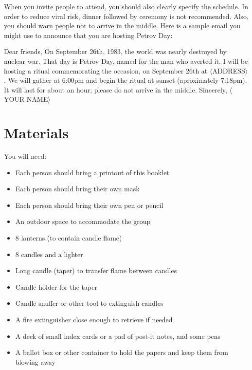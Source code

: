 \documentclass{article}
\begin{document}
When you invite people to attend, you should also clearly specify the
schedule. In order to reduce viral risk, dinner followed by ceremony is not
recommended. Also, you should warn people not to arrive in the middle. Here is
a sample email you might use to announce that you are hosting Petrov Day:

\begin{center}
	\parbox{4.5in}{
	Dear friends,\newline
	On September 26th, 1983, the world was nearly destroyed by nuclear war.
	That day is Petrov Day, named for the man who averted it. I will be
	hosting a ritual commemorating the occasion, on September 26th at
	$\langle$ADDRESS$\rangle$. We will gather at 6:00pm and begin the ritual
	at sunset (aproximately 7:18pm). It will last for about an hour; please do
	not arrive in the middle.\newline
	Sincerely,\newline
	$\langle$YOUR NAME$\rangle$}
\end{center}

\section{Materials}
You will need:

\begin{itemize} \itemsep0pt \parskip0pt 
    \item Each person should bring a printout of this booklet
    \item Each person should bring their own mask
    \item Each person should bring their own pen or pencil
    \item An outdoor space to accommodate the group
    \item 8 lanterns (to contain candle flame)
    \item 8 candles and a lighter
    \item Long candle (taper) to transfer flame between candles
    \item Candle holder for the taper
    \item Candle snuffer or other tool to extinguish candles
    \item A fire extinguisher close enough to retrieve if needed
    \item A deck of small index cards or a pad of post-it notes, and some pens
	\item A ballot box or other container to hold the papers and keep them from
blowing away
\end{itemize}
\end{document}
